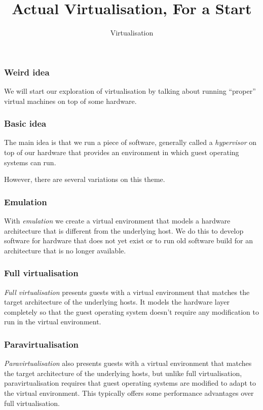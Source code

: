 \documentclass[10pt]{beamer}
\title{Actual Virtualisation, For a Start}
\author[I720]{Virtualisation}
\institute[Otago Polytechnic]{
  Otago Polytechnic \\
  Dunedin, New Zealand \\
}
\date{}
\begin{document}
\begin{frame}[plain]
  \titlepage
\end{frame}


\begin{frame}
  \frametitle{Weird idea} 
  We will start our exploration of virtualisation by talking about running ``proper'' virtual machines on top of some hardware.
  \end{frame}
  
\begin{frame}
  \frametitle{Basic idea}
  
  The main idea is that we run a piece of software, generally called a \emph{hypervisor} on top of our 
  hardware that provides an environment in which guest operating systems can run.
   
  However, there are several variations on this theme.
\end{frame}
  
\begin{frame}
  \frametitle{Emulation}
  
   With \emph{emulation} we create a virtual environment that models a hardware architecture that is 
   different from the underlying host. We do this to develop software for hardware that does not yet exist or
   to run old software build for an architecture that is no longer available.
\end{frame}

\begin{frame}
  \frametitle{Full virtualisation}
  
   \emph{Full virtualisation} presents guests with a virtual environment that matches the target architecture of the underlying hosts. It models the hardware layer completely so that the guest operating system doesn't require any modification to run in the virtual environment.
\end{frame}

\begin{frame}
  \frametitle{Paravirtualisation}
  
   \emph{Paravirtualisation} also presents guests with a virtual environment that matches the target architecture of the underlying hosts, but unlike full virtualisation,
   paravirtualisation requires that guest operating systems are modified to adapt to the virtual environment. This typically offers some performance advantages 
   over full virtualisation.
   
\end{frame}
\end{document}
